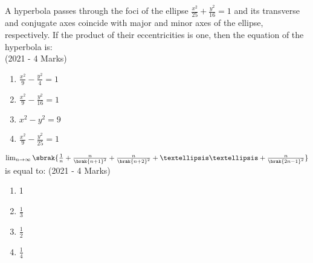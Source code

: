     \item{
            A hyperbola passes through the foci of the ellipse $\frac{x^2}{25} + \frac{y^2}{16} = 1$ and its transverse and conjugate axes coincide with major and minor axes of the ellipse, respectively. If the product of their eccentricities is one, then the equation of the hyperbola is:\\ \text{ }
             \hfill
                {(2021 - 4 Marks)}
            \begin{multicols}{2}
                \begin{enumerate}
                    \item $\frac{x^2}{9} - \frac{y^2}{4} = 1$
                    
                    \item $\frac{x^2}{9} - \frac{y^2}{16} = 1$
                    
                    \item $x^2 - y^2 = 9$
                    
                    \item $\frac{x^2}{9} - \frac{y^2}{25} = 1$
                \end{enumerate}
            \end{multicols}

        
        }
    \item{
            $\lim_{n \rightarrow \infty}\sbrak{\frac{1}{n} + \frac{n}{\brak{n+1}^2} + \frac{n}{\brak{n+2}^2} +……+ \frac{n}{\brak{2n-1}^2}}$ is equal to: 
             \hfill
                {(2021 - 4 Marks)}
            \begin{multicols}{4}
                \begin{enumerate}
                	\item 1
                	\item $\frac{1}{3}$
                	\item $\frac{1}{2}$
                	\item $\frac{1}{4}$
                \end{enumerate}
            \end{multicols}
        
        }
